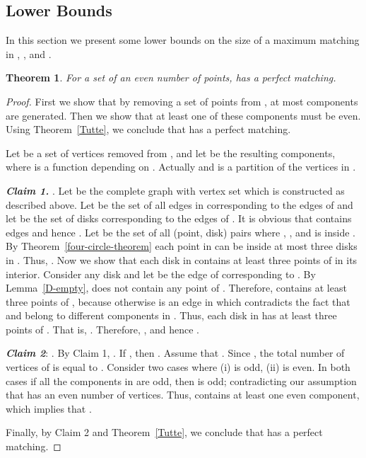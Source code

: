 \documentclass[11pt,a4paper]{article}
\newcommand{\kGG}[2]{}
\newtheorem{theorem}{Theorem}
\begin{document}
\subsection{Lower Bounds}
\label{lower-bounds-section}

In this section we present some lower bounds on the size of a maximum matching in \kGG{2}{}, \kGG{1}{}, and \kGG{0}{}.

\begin{theorem}
 \label{matching-2GG}
For a set  of an even number of points, \kGG{2}{} has a perfect matching.
\end{theorem}
\begin{proof}
First we show that by removing a set  of  points from \kGG{2}{}, at most  components are generated. Then we show that at least one of these components must be even. Using Theorem~\ref{Tutte}, we conclude that \kGG{2}{} has a perfect matching.

Let  be a set of  vertices removed from \kGG{2}{}, and let  be the resulting  components, where  is a function depending on . Actually  and  is a partition of the vertices in . 

{\bf\em  Claim 1.} . Let  be the complete graph with vertex set  which is constructed as described above. Let  be the set of all edges in  corresponding to the edges of  and let  be the set of disks corresponding to the edges of . It is obvious that  contains  edges and hence . Let  be the set of all (point, disk) pairs where , , and  is inside . By Theorem~\ref{four-circle-theorem} each point in  can be inside at most three disks in . Thus, .
Now we show that each disk in  contains at least three points of  in its interior.  
Consider any disk  and let  be the edge of  corresponding to . By Lemma~\ref{D-empty},  does not contain any point of . Therefore,  contains at least three points of , because otherwise  is an edge in \kGG{2}{} which contradicts the fact that  and  belong to different components in . Thus, each disk in  has at least three points of . That is, . Therefore, , and hence .

{\bf \em Claim 2}: . By Claim 1, . If , then . Assume that . Since , the total number of vertices of  is equal to . Consider two cases where (i)  is odd, (ii)  is even. In both cases if all the components in  are odd, then  is odd; contradicting our assumption that  has an even number of vertices. Thus,  contains at least one even component, which implies that .

Finally, by Claim 2 and Theorem~\ref{Tutte}, we conclude that \kGG{2}{} has a perfect matching.
\end{proof}
\end{document}
